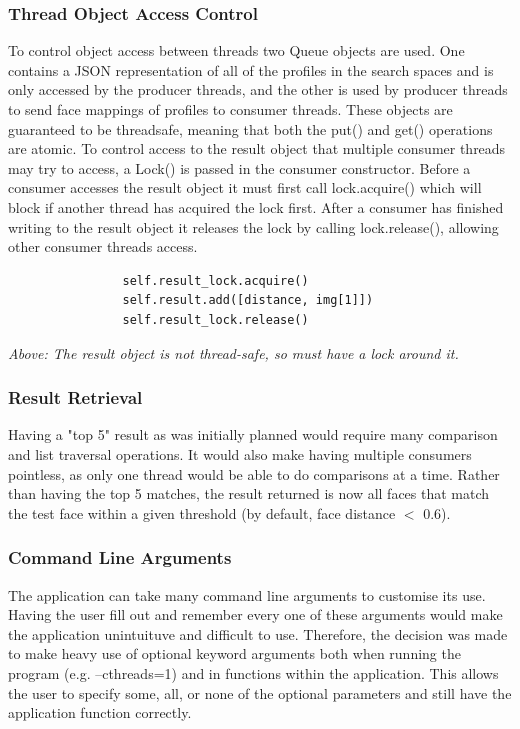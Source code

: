 \documentclass[12pt]{article}
\begin{document}
\subsubsection{Thread Object Access Control}
To control object access between threads two Queue objects are used. One contains a JSON representation of all of the profiles in the search spaces and is only accessed by the producer threads, and the other is used by producer threads to send face mappings of profiles to consumer threads. These objects are guaranteed to be threadsafe, meaning that both the put() and get() operations are atomic. To control access to the result object that multiple consumer threads may try to access, a Lock() is passed in the consumer constructor. Before a consumer accesses the result object it must first call lock.acquire() which will block if another thread has acquired the lock first. After a consumer has finished writing to the result object it releases the lock by calling lock.release(), allowing other consumer threads access.

\begin{lstlisting}
				self.result_lock.acquire()
                self.result.add([distance, img[1]])
                self.result_lock.release()
\end{lstlisting}
\textit{Above: The result object is not thread-safe, so must have a lock around it.}

\subsubsection{Result Retrieval}
Having a "top 5" result as was initially planned would require many comparison and list traversal operations. It would also make having multiple consumers pointless, as only one thread would be able to do comparisons at a time. Rather than having the top 5 matches, the result returned is now all faces that match the test face within a given threshold (by default, face distance $<$ 0.6).

\subsubsection{Command Line Arguments}
The application can take many command line arguments to customise its use. Having the user fill out and remember every one of these arguments would make the application unintuituve and difficult to use. Therefore, the decision was made to make heavy use of optional keyword arguments both when running the program (e.g. --cthreads=1) and in functions within the application. This allows the user to specify some, all, or none of the optional parameters and still have the application function correctly. 
\end{document}
